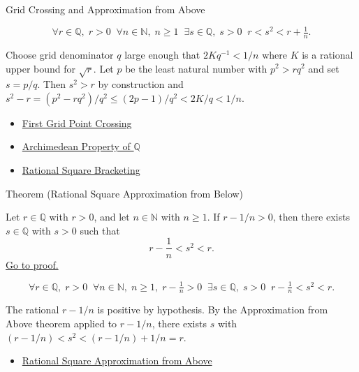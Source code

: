 \begin{topicbox}{Grid Crossing and Approximation from Above}
\begin{remark*}
\[
\forall r\in\mathbb{Q},\;r>0\;\;
\forall n\in\mathbb{N},\;n\ge1\;\;
\exists s\in\mathbb{Q},\;s>0\;\;
r < s^2 < r+\tfrac{1}{n}.
\]
\end{remark*}

\begin{remark*}[Interpretation]
Choose grid denominator $q$ large enough that $2Kq^{-1} < 1/n$ where $K$ is a
rational upper bound for $\sqrt{r}$. Let $p$ be the least natural number with
$p^2 > rq^2$ and set $s = p/q$. Then $s^2 > r$ by construction and
$s^2 - r = (p^2 - rq^2)/q^2 \le (2p-1)/q^2 < 2K/q < 1/n$.
\end{remark*}

\begin{dependencies}
\begin{itemize}
  \item \hyperref[lem:first-grid-point-crossing]{First Grid Point Crossing}
  \item \hyperref[thm:archimedean-q]{Archimedean Property of $\mathbb{Q}$}
  \item \hyperref[thm:rational-square-bracketing]{Rational Square Bracketing}
\end{itemize}
\end{dependencies}

\begin{theorembox}{Theorem (Rational Square Approximation from Below)}
\begin{theorem}
\label{thm:rational-square-approximation-from-below}
Let $r\in\mathbb{Q}$ with $r>0$, and let $n\in\mathbb{N}$ with $n\ge 1$.
If $r-1/n>0$, then there exists $s\in\mathbb{Q}$ with $s>0$ such that
\[
r-\frac1n<s^2<r.
\]
\hyperref[prf:rational-square-approximation-from-below]{Go to proof.}
\end{theorem}
\end{theorembox}

\begin{remark*}
\[
\forall r\in\mathbb{Q},\;r>0\;\;
\forall n\in\mathbb{N},\;n\ge1,\;r-\tfrac{1}{n}>0\;\;
\exists s\in\mathbb{Q},\;s>0\;\;
r - \tfrac{1}{n} < s^2 < r.
\]
\end{remark*}

\begin{remark*}[Interpretation]
The rational $r - 1/n$ is positive by hypothesis. By the Approximation from
Above theorem applied to $r - 1/n$, there exists $s$ with
$(r-1/n) < s^2 < (r-1/n) + 1/n = r$.
\end{remark*}

\begin{dependencies}
\begin{itemize}
  \item \hyperref[thm:rational-square-approximation-from-above]{Rational Square Approximation from Above}
\end{itemize}
\end{dependencies}
\end{topicbox}
